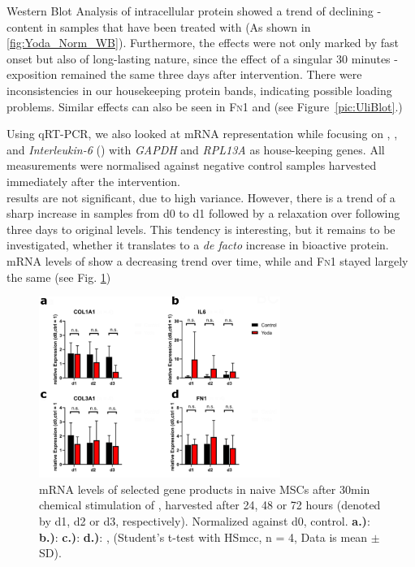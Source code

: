 Western Blot Analysis of intracellular protein showed a trend of declining \colone-content in samples that have been treated with \Yoda{} (As shown in \ref{fig:Yoda_Norm_WB}). Furthermore, the effects were not only marked by fast onset but also of long-lasting nature, since the effect of a singular 30 minutes \Yoda{}-exposition remained the same three days after intervention. There were inconsistencies in our housekeeping protein bands, indicating possible loading problems. Similar effects can also be seen in \textsc{Fn1} and \colthree{} (see Figure~\vref{pic:UliBlot}.) \par

Using qRT-PCR, we also looked at mRNA representation while focusing on \coloneGene{}, \colthreeGene{}, \Fn{} and \textit{Interleukin-6} (\ILGene{}) with \textit{GAPDH} and \textit{RPL13A} as house-keeping genes. All measurements were normalised against negative control samples harvested immediately after the intervention. \\
\ILGene results are not significant, due to high variance. However, there is a trend of a sharp increase in \Yoda{} samples from d0 to d1 followed by a relaxation over following three days to original levels. This tendency is interesting, but it remains to be investigated, whether it translates to a \textit{de facto} increase in bioactive \IL protein. mRNA levels of \colone{} show a decreasing trend over time, while \colthree and \textsc{Fn}1 stayed largely the same (see Fig. \ref{fig:Yoda_Norm_PCR})\par

\begin{figure}[ht]
	\centering
	\includegraphics[width = 0.7\textwidth]{NormalYodaExp_PCR.png}
	\caption{mRNA levels of selected gene products in naive MSCs after 30min chemical stimulation of \Piezo{}, harvested after 24, 48 or 72 hours (denoted by d1, d2 or d3, respectively). Normalized against d0, control.
	    \textbf{a.)}: \coloneGene{}
		\textbf{b.)}: \ILGene{}
		\textbf{c.)}: \colthreeGene{}
		\textbf{d.)}: \FnGene, 
		(Student's t-test with HSmcc, n = 4, Data is mean $\pm$ SD). 
	}
	\label{fig:Yoda_Norm_PCR}
\end{figure}




